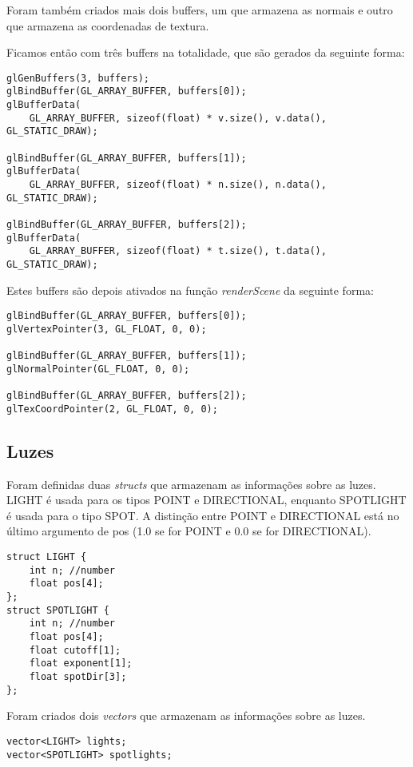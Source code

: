 \documentclass[11pt,a4paper]{report}
\begin{document}
Foram também criados mais dois buffers, um que armazena as normais e outro que armazena as coordenadas de textura.

Ficamos então com três buffers na totalidade, que são gerados da seguinte forma:
\begin{lstlisting}[style = code]
glGenBuffers(3, buffers);
glBindBuffer(GL_ARRAY_BUFFER, buffers[0]);
glBufferData(
	GL_ARRAY_BUFFER, sizeof(float) * v.size(), v.data(), GL_STATIC_DRAW);

glBindBuffer(GL_ARRAY_BUFFER, buffers[1]);
glBufferData(
	GL_ARRAY_BUFFER, sizeof(float) * n.size(), n.data(), GL_STATIC_DRAW);

glBindBuffer(GL_ARRAY_BUFFER, buffers[2]);
glBufferData(
	GL_ARRAY_BUFFER, sizeof(float) * t.size(), t.data(), GL_STATIC_DRAW);
\end{lstlisting}

Estes buffers são depois ativados na função \emph{renderScene} da seguinte forma:
\begin{lstlisting}[style = code]
glBindBuffer(GL_ARRAY_BUFFER, buffers[0]);
glVertexPointer(3, GL_FLOAT, 0, 0);

glBindBuffer(GL_ARRAY_BUFFER, buffers[1]);
glNormalPointer(GL_FLOAT, 0, 0);

glBindBuffer(GL_ARRAY_BUFFER, buffers[2]);
glTexCoordPointer(2, GL_FLOAT, 0, 0);
\end{lstlisting}

\subsection{Luzes}
Foram definidas duas \emph{structs} que armazenam as informações sobre as luzes. LIGHT é usada para os tipos POINT e DIRECTIONAL, enquanto SPOTLIGHT é usada para o tipo SPOT. A distinção entre POINT e DIRECTIONAL está no último argumento de pos (1.0 se for POINT e 0.0 se for DIRECTIONAL).

\begin{lstlisting}[style = code]
struct LIGHT {
	int n; //number
	float pos[4];
};
struct SPOTLIGHT {
	int n; //number
	float pos[4];
	float cutoff[1];
	float exponent[1];
	float spotDir[3];
};
\end{lstlisting}

Foram criados dois \emph{vectors} que armazenam as informações sobre as luzes.

\begin{lstlisting}[style = code]
vector<LIGHT> lights;
vector<SPOTLIGHT> spotlights;
\end{lstlisting}
\end{document}
